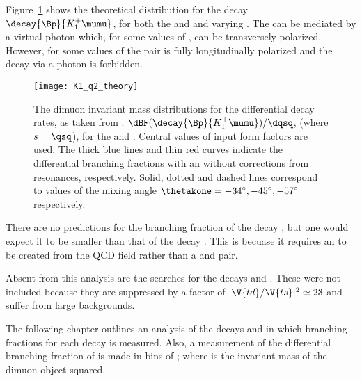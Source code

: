 Figure~\ref{fig:th:thetak1} shows the theoretical \qsq distribution for the decay
$\decay{\Bp}{K_1^+\mumu}$, for both the  and  and varying \thetakone.
The  can be mediated by a virtual photon which, for some values of \thetakone, can
be transversely polarized.
However, for some values of \thetakone the \mumu pair is fully longitudinally polarized and the
decay via a photon is forbidden.

\begin{figure}
  \begin{center}
    \texttt{[image: K1\_q2\_theory]}
    \caption[Theoretical \qsq distribution for $\decay{\Bp}{K_1^+\mumu}$]
    {
      The dimuon invariant mass distributions for the differential decay rates, as taken from
      .
      $\dBF(\decay{\Bp}{K_1^+\mumu})/\dqsq$, (where $s=\qsq$), for the  and .
      Central values of input form factors are used.
      The thick blue lines and thin red curves indicate the differential branching fractions with
      an without corrections from resonances, respectively.
      Solid, dotted and dashed lines correspond to values of the mixing angle
      $\thetakone=-34^\circ,-45^\circ,-57^\circ$ respectively.
    }
    \label{fig:th:thetak1}
  \end{center}
\end{figure}

There are no predictions for the branching fraction of the decay \btophikmumu,
but one would expect it to be smaller than that of the decay \btokpipimumu.
This is becuase it requires an \ssbar to be created from the QCD field rather than a \uubar and
\ddbar pair.

Absent from this analysis are the searches for the decays \decay{\Bp}{\Kp\Km\pip\mumu}
and \decay{\Bp}{\pipi\pim\mumu}.
These were not included because they are suppressed by a factor of $|\V{td}/\V{ts}|^2\simeq23$ and
suffer from large backgrounds.

The following chapter outlines an analysis of the decays \btokpipimumu and \btophikmumu in which
branching fractions for each decay is measured.
Also, a measurement of the differential branching fraction of \btokpipimumu is made in bins of
\qsq; where \qsq is the invariant mass of the dimuon object squared.






